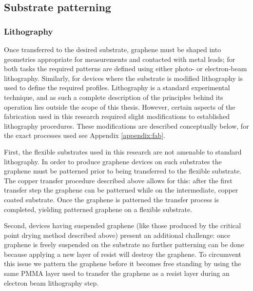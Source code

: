 \documentclass[edeposit,fullpage,draftthesis]{uiucthesis2009}
\begin{document}
            
        \subsection{Substrate patterning}
        
            \subsubsection{Lithography}
            
            Once transferred to the desired substrate, graphene must be shaped into geometries
            appropriate for measurements and contacted with metal leads; for both tasks the 
            required patterns are defined using either photo- or electron-beam lithography.
            Similarly, for devices where the substrate is modified lithography is used to
            define the required profiles.
            Lithography is a standard experimental technique, and as such a complete description
            of the principles behind its operation lies outside the scope of this thesis. However,
            certain aspects of the fabrication used in this research required
            slight modifications to established lithography procedures. These modifications
            are described conceptually below, for the exact processes used see Appendix \ref{appendix:fab}.
            
            First, the flexible substrates used in this research are not amenable to standard lithography. 
            In order to produce graphene devices on such substrates the graphene must be patterned
            prior to being transferred to the flexible substrate. The copper transfer procedure
            described above allows for this: after the first transfer step the graphene 
            can be patterned while on the intermediate, copper coated substrate. Once the graphene
            is patterned the transfer process is completed, yielding patterned graphene on a flexible 
            substrate.
            
            Second, devices having suspended graphene (like those produced by the critical point
            drying method described above) present an additional challenge: once graphene is freely
            suspended on the substrate no further patterning can be done because applying a new layer
            of resist will destroy the graphene. To circumvent this issue we pattern the graphene
            before it becomes free standing by using the same PMMA layer
            used to transfer the graphene as a resist layer during an electron beam lithography step.
            
\end{document}
